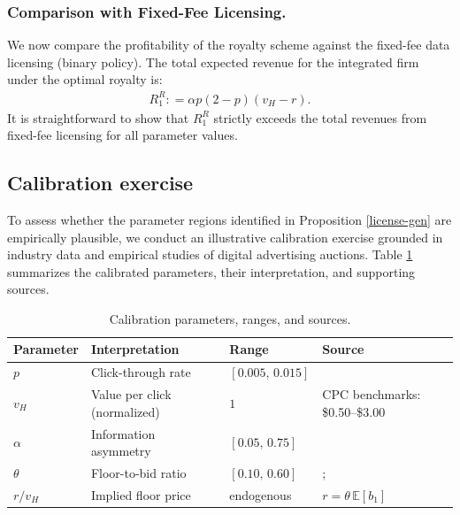 \documentclass[11pt]{article}
\theoremstyle{plain}
\theoremstyle{definition}
\theoremstyle{plain}
\theoremstyle{plain}
\theoremstyle{plain}
\theoremstyle{plain}
\numberwithin{equation}{section}
\begin{document}
\subsubsection{Comparison with Fixed-Fee Licensing.}
We now compare the profitability of the royalty scheme against the fixed-fee data licensing (binary policy). The total expected revenue for the integrated firm under the optimal royalty is:
\begin{align*}
    R^{R}_1 : = \alpha p (2-p) (v_H-r).
\end{align*}
It is straightforward to show that $R^{R}_1$ strictly exceeds the total revenues from fixed-fee licensing for all parameter values.
\fi
 
\subsection{Calibration exercise}\label{sect:calibration}

To assess whether the parameter regions identified in Proposition \ref{license-gen} are empirically plausible, we conduct an illustrative calibration exercise grounded in industry data and empirical studies of digital advertising auctions. Table \ref{tab:calibration-params} summarizes the calibrated parameters, their interpretation, and supporting sources.

\begin{table}[h!]
\centering
\small
\begin{tabular}{@{}lllp{5.2cm}@{}}
\toprule
\textbf{Parameter} & \textbf{Interpretation} & \textbf{Range} & \textbf{Source} \\
\midrule
$p$ & Click-through rate & $[0.005, \, 0.015]$ & \textcite{irvineGoogleAdsBenchmarks} \\[3pt]
$v_H$ & Value per click (normalized) & $1$ & CPC benchmarks: \$0.50--\$3.00 \\[3pt]
$\alpha$ & Information asymmetry & $[0.05, \, 0.75]$ & \textcite{competitionandmarketsauthorityOnlinePlatformsDigital2020} \\[3pt]
$\theta$ & Floor-to-bid ratio & $[0.10, \, 0.60]$ & \textcite{choiOptimizingReservePrices2023}; \textcite{fengReservePriceOptimization2021} \\[3pt]
$r / v_H$ & Implied floor price & endogenous & $r = \theta \, \mathbb{E}[b_1]$ \\
\bottomrule
\end{tabular}
\caption{Calibration parameters, ranges, and sources.}
\label{tab:calibration-params}
\end{table}
\end{document}
